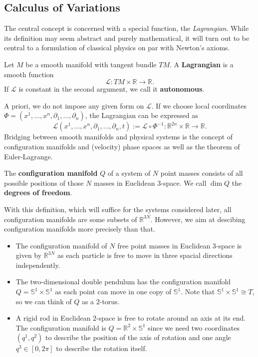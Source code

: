 \subsection*{Calculus of Variations}
The central concept is concerned with a special function, the \emph{Lagrangian}. While its definition may seem abstract and purely mathematical, it will turn out to be central to a formulation of classical physics on par with Newton's axioms.
\begin{definition}[Lagrangian]
    Let $M$ be a smooth manifold with tangent bundle $TM$. A \textbf{Lagrangian} is a smooth function \[
    \mathcal{L}: TM \times \mathbb{R} \to \mathbb{R}
    .\] If $\mathcal{L}$ is constant in the second argument, we call it \textbf{autonomous}. 
\end{definition}
A priori, we do not impose any given form on $\mathcal{L}$. If we choose local coordinates $\Phi=(x^1, \dots, x^n, \partial_1, \dots, \partial_n)$, the Lagrangian can be expressed as \[
    \mathcal{L}(x^1, \dots, x^n, \partial_1, \dots, \partial_n,t):= \mathcal{L} \circ \Phi^{-1}: \mathbb{R}^{2n} \times \mathbb{R} \to \mathbb{R}
.\] 
Bridging between smooth manifolds and physical systems is the concept of configuration manifolds and (velocity) phase spaces as well as the theorem of Euler-Lagrange.
\begin{definition}
    The \textbf{configuration manifold} $Q$ of a system of $N$ point masses consists of all possible positions of those $N$ masses in Euclidean $3$-space. We call $\dim Q$ the \textbf{degrees of freedom}.
\end{definition}
With this definition, which will suffice for the systems considered later, all configuration manifolds are some subsets of $\mathbb{R}^{3N}$. However, we aim at descibing configuration manifolds more precisely than that.
\begin{eg}
    \begin{itemize}
        \item The configuration manifold of $N$ free point masses in Euclidean $3$-space is given by $\mathbb{R}^{3N}$ as each particle is free to move in three spacial directions independently.
        \item The two-dimensional double pendulum has the configuration manifold $Q=\mathbb{S}^1 \times \mathbb{S}^1$ as each point can move in one copy of $\mathbb{S}^1$. Note that $\mathbb{S}^1 \times \mathbb{S}^1 \cong T$, so we can think of $Q$ as a $2$-torus.
        \item A rigid rod in Euclidean $2$-space is free to rotate around an axis at its end. The configuration manifold is $Q=\mathbb{R}^2 \times \mathbb{S}^1$ since we need two coordinates $(q^1,q^2)$ to describe the position of the axis of rotation and one angle $q^3 \in [0, 2\pi]$ to describe the rotation itself.
    \end{itemize}
\end{eg}
